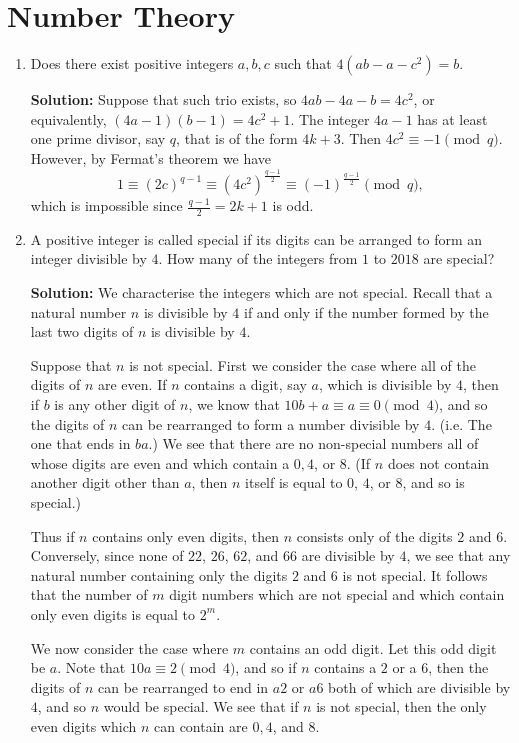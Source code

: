 \documentclass{article}
\newcommand{\solution}[1]{%
\ifsolutions%
    \textbf{Solution: } #1
\fi
}
\begin{document}
\section{Number Theory}
\begin{enumerate}

\item Does there exist positive integers $a, b, c$ such that $4(ab - a - c^2) = b$.

\solution{Suppose that such trio exists, so $4ab - 4a - b = 4c^2$, or equivalently, $(4a - 1)(b - 1) = 4c^2 + 1$. The integer $4a - 1$ has at least one prime divisor, say $q$, that is of the form $4k + 3$. Then $4c^2 \equiv -1 \pmod q$. However, by Fermat's theorem we have
\[
    1 \equiv {(2c)}^{q - 1} \equiv {(4c^2)}^{\frac{q-1}{2}} \equiv {(-1)}^{\frac{q-1}{2}} \pmod q,
\]
which is impossible since $\frac{q-1}{2} = 2k + 1$ is odd.}

\item A positive integer is called special if its digits can be arranged to form an integer divisible by $4$. How many of the integers from $1$ to $2018$ are special?

\solution{We characterise the integers which are not special. Recall that a natural number $n$ is divisible by $4$ if and only if the number formed by the last two digits of $n$ is divisible by $4$.

Suppose that $n$ is not special. First we consider the case where all of the digits of $n$ are even. If $n$ contains a digit, say $a$, which is divisible by $4$, then if $b$ is any other digit of $n$, we know that $10b + a \equiv a \equiv 0 \pmod 4$, and so the digits of $n$ can be rearranged to form a number divisible by $4$. (i.e. The one that ends in $ba$.) We see that there are no non-special numbers all of whose digits are even and which contain a $0, 4$, or $8$. (If $n$ does not contain another digit other than $a$, then $n$ itself is equal to $0$, $4$, or $8$, and so is special.)

Thus if $n$ contains only even digits, then $n$ consists only of the digits $2$ and $6$. Conversely, since none of $22$, $26$, $62$, and $66$ are divisible by $4$, we see that any natural number containing only the digits $2$ and $6$ is not special. It follows that the number of $m$ digit numbers which are not special and which contain only even digits is equal to $2^m$.

We now consider the case where $m$ contains an odd digit. Let this odd digit be $a$. Note that $10a \equiv 2 \pmod 4$, and so if $n$ contains a $2$ or a $6$, then the digits of $n$ can be rearranged to end in $a2$ or $a6$ both of which are divisible by $4$, and so $n$ would be special. We see that if $n$ is not special, then the only even digits which $n$ can contain are $0, 4$, and $8$.

}
\end{enumerate}
\end{document}
